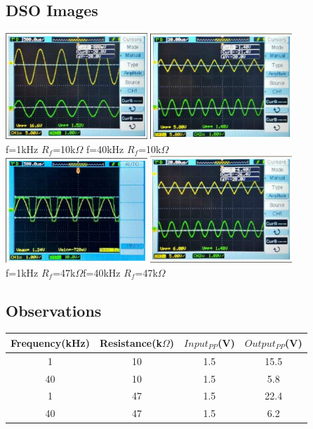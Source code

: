 \documentclass{article}
\begin{document}
\subsection{DSO Images}
\begin{center}
    \includegraphics[width=0.4\textwidth]{i12.png}
    \includegraphics[width=0.4\textwidth]{i13.png}\\
    f=1kHz  $R_{f}$=10k$\Omega$ \hspace{20mm}f=40kHz  $R_{f}$=10k$\Omega$\\
    \includegraphics[width=0.4\textwidth]{i14.png}
    \includegraphics[width=0.4\textwidth]{i15.png}\\
    f=1kHz  $R_{f}$=47k$\Omega$\hspace{20mm}f=40kHz  $R_{f}$=47k$\Omega$\\
\end{center}
\subsection{Observations}
\begin{center}
\begin{tabular}{|c|c|c|c|}
\hline
    Frequency(kHz) & Resistance(k$\Omega$) & $Input_{PP}$(V) & $Output_{PP}$(V)\\
    \hline
    1 & 10 & 1.5 & 15.5\\
    40 & 10 & 1.5 & 5.8 \\
    1 & 47 & 1.5 & 22.4\\
    40 & 47 & 1.5 & 6.2\\
\hline
\end{tabular}
\end{center}
\end{document}

